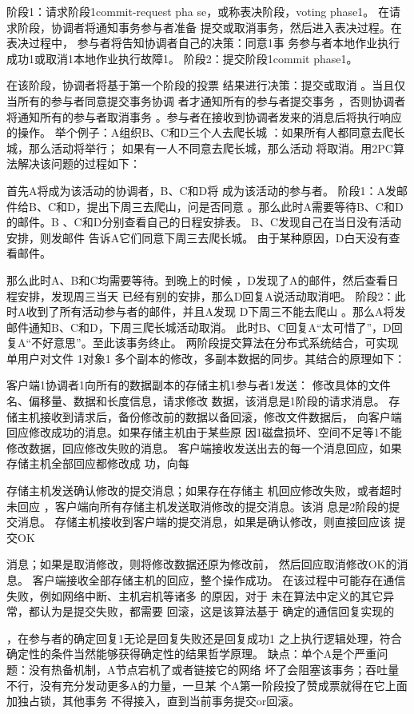 阶段1：请求阶段1commit-request pha
se，或称表决阶段，voting phase1。
在请求阶段，协调者将通知事务参与者准备
提交或取消事务，然后进入表决过程。在表决过程中，
参与者将告知协调者自己的决策：同意1事
务参与者本地作业执行成功1或取消1本地作业执行故障1。
阶段2：提交阶段1commit phase1。

在该阶段，协调者将基于第一个阶段的投票
结果进行决策：提交或取消
。当且仅当所有的参与者同意提交事务协调
者才通知所有的参与者提交事务
，否则协调者将通知所有的参与者取消事务
。参与者在接收到协调者发来的消息后将执行响应的操作。
举个例子：A组织B、C和D三个人去爬长城
：如果所有人都同意去爬长城，那么活动将举行；
如果有一人不同意去爬长城，那么活动
将取消。用2PC算法解决该问题的过程如下：

首先A将成为该活动的协调者，B、C和D将
成为该活动的参与者。
阶段1：A发邮件给B、C和D，提出下周三去爬山，问是否同意
。那么此时A需要等待B、C和D的邮件。B
、C和D分别查看自己的日程安排表。
B、C发现自己在当日没有活动安排，则发邮件
告诉A它们同意下周三去爬长城。
由于某种原因，D白天没有查看邮件。

那么此时A、B和C均需要等待。到晚上的时候
，D发现了A的邮件，然后查看日程安排，发现周三当天
已经有别的安排，那么D回复A说活动取消吧。
阶段2：此时A收到了所有活动参与者的邮件，并且A发现
D下周三不能去爬山
。那么A将发邮件通知B、C和D，下周三爬长城活动取消。
此时B、C回复A“太可惜了”，D回复A“不好意思”。至此该事务终止。
两阶段提交算法在分布式系统结合，可实现单用户对文件
1对象1
多个副本的修改，多副本数据的同步。其结合的原理如下：

客户端1协调者1向所有的数据副本的存储主机1参与者1发送：
修改具体的文件名、偏移量、数据和长度信息，请求修改
数据，该消息是1阶段的请求消息。
存储主机接收到请求后，备份修改前的数据以备回滚，修改文件数据后，
向客户端回应修改成功的消息。如果存储主机由于某些原
因1磁盘损坏、空间不足等1不能
修改数据，回应修改失败的消息。
客户端接收发送出去的每一个消息回应，如果存储主机全部回应都修改成
功，向每


存储主机发送确认修改的提交消息；如果存在存储主
机回应修改失败，或者超时未回应
，客户端向所有存储主机发送取消修改的提交消息。该消
息是2阶段的提交消息。
存储主机接收到客户端的提交消息，如果是确认修改，则直接回应该
提交OK


消息；如果是取消修改，则将修改数据还原为修改前，
然后回应取消修改OK的消息。
客户端接收全部存储主机的回应，整个操作成功。
在该过程中可能存在通信失败，例如网络中断、主机宕机等诸多
的原因，对于
未在算法中定义的其它异常，都认为是提交失败，都需要
回滚，这是该算法基于
确定的通信回复实现的

，在参与者的确定回复1无论是回复失败还是回复成功1
之上执行逻辑处理，符合确定性的条件当然能够获得确定性的结果哲学原理。
缺点：单个A是个严重问题：没有热备机制，A节点宕机了或者链接它的网络
坏了会阻塞该事务；吞吐量不行，没有充分发动更多A的力量，一旦某
个A第一阶段投了赞成票就得在它上面加独占锁，其他事务
不得接入，直到当前事务提交or回滚。
